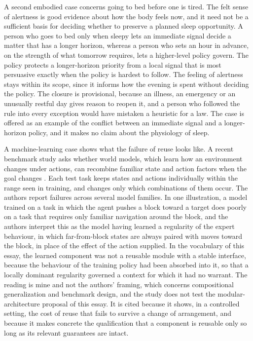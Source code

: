 \documentclass[12pt, a4paper]{article}
\begin{document}
A second embodied case concerns going to bed before one is tired. The felt sense of alertness is good evidence about how the body feels now, and it need not be a sufficient basis for deciding whether to preserve a planned sleep opportunity. A person who goes to bed only when sleepy lets an immediate signal decide a matter that has a longer horizon, whereas a person who sets an hour in advance, on the strength of what tomorrow requires, lets a higher-level policy govern. The policy protects a longer-horizon priority from a local signal that is most persuasive exactly when the policy is hardest to follow. The feeling of alertness stays within its scope, since it informs how the evening is spent without deciding the policy. The closure is provisional, because an illness, an emergency or an unusually restful day gives reason to reopen it, and a person who followed the rule into every exception would have mistaken a heuristic for a law. The case is offered as an example of the conflict between an immediate signal and a longer-horizon policy, and it makes no claim about the physiology of sleep.

A machine-learning case shows what the failure of reuse looks like. A recent benchmark study asks whether world models, which learn how an environment changes under actions, can recombine familiar state and action factors when the goal changes \citep{nam2026}. Each test task keeps states and actions individually within the range seen in training, and changes only which combinations of them occur. The authors report failures across several model families. In one illustration, a model trained on a task in which the agent pushes a block toward a target does poorly on a task that requires only familiar navigation around the block, and the authors interpret this as the model having learned a regularity of the expert behaviour, in which far-from-block states are always paired with moves toward the block, in place of the effect of the action supplied. In the vocabulary of this essay, the learned component was not a reusable module with a stable interface, because the behaviour of the training policy had been absorbed into it, so that a locally dominant regularity governed a context for which it had no warrant. The reading is mine and not the authors' framing, which concerns compositional generalization and benchmark design, and the study does not test the modular-architecture proposal of this essay. It is cited because it shows, in a controlled setting, the cost of reuse that fails to survive a change of arrangement, and because it makes concrete the qualification that a component is reusable only so long as its relevant guarantees are intact.
\end{document}
